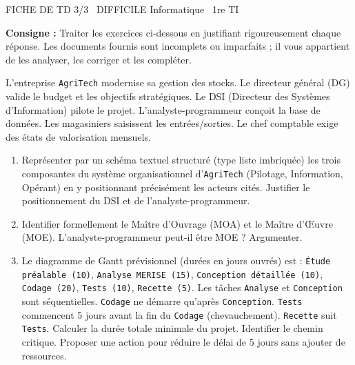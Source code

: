 \documentclass[11pt]{article}
\begin{document}
\begin{tcolorbox}[enhanced,colback=popink,colframe=popink,arc=10pt,boxrule=0pt,left=12pt,right=12pt,top=9pt,bottom=9pt]
{\color{white}\popxbold\small FICHE DE TD 3/3 \textbullet\ DIFFICILE \hfill Informatique \textbullet\ 1re TI\par}
\end{tcolorbox}
\vspace{4pt}
\noindent \textbf{Consigne :} Traiter les exercices ci-dessous en justifiant rigoureusement chaque réponse. Les documents fournis sont incomplets ou imparfaits ; il vous appartient de les analyser, les corriger et les compléter.

\begin{exercice}
L'entreprise \texttt{AgriTech} modernise sa gestion des stocks. Le directeur général (DG) valide le budget et les objectifs stratégiques. Le DSI (Directeur des Systèmes d'Information) pilote le projet. L'analyste-programmeur conçoit la base de données. Les magasiniers saisissent les entrées/sorties. Le chef comptable exige des états de valorisation mensuels.
\begin{enumerate}
    \item Représenter par un schéma textuel structuré (type liste imbriquée) les trois composantes du système organisationnel d'\texttt{AgriTech} (Pilotage, Information, Opérant) en y positionnant précisément les acteurs cités. Justifier le positionnement du DSI et de l'analyste-programmeur.
    \item Identifier formellement le Maître d'Ouvrage (MOA) et le Maître d'Œuvre (MOE). L'analyste-programmeur peut-il être MOE ? Argumenter.
    \item Le diagramme de Gantt prévisionnel (durées en jours ouvrés) est : \texttt{Étude préalable (10)}, \texttt{Analyse MERISE (15)}, \texttt{Conception détaillée (10)}, \texttt{Codage (20)}, \texttt{Tests (10)}, \texttt{Recette (5)}. Les tâches \texttt{Analyse} et \texttt{Conception} sont séquentielles. \texttt{Codage} ne démarre qu'après \texttt{Conception}. \texttt{Tests} commencent 5 jours avant la fin du \texttt{Codage} (chevauchement). \texttt{Recette} suit \texttt{Tests}. Calculer la durée totale minimale du projet. Identifier le chemin critique. Proposer une action pour réduire le délai de 5 jours sans ajouter de ressources.
\end{enumerate}
\end{exercice}
\end{document}
